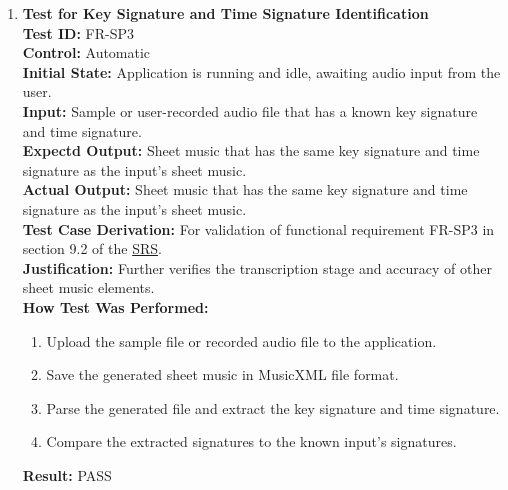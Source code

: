 \documentclass[12pt, titlepage]{article}
\begin{document}
\begin{enumerate}
    \item \textbf{Test for Key Signature and Time Signature Identification} \\
      \newline
      \textbf{Test ID:} FR-SP3 \\
      \textbf{Control:} Automatic \\
      \textbf{Initial State:} Application is running and idle, awaiting audio input from the user. \\
      \textbf{Input:} Sample or user-recorded audio file that has a known key signature and time signature. \\
      \textbf{Expectd Output:} Sheet music that has the same key signature and time signature as the input’s sheet music. \\
      \textbf{Actual Output:} Sheet music that has the same key signature and time signature as the input’s sheet music. \\
      \textbf{Test Case Derivation:} For validation of functional requirement FR-SP3 in section 9.2 of the 
      \href{https://github.com/emilyperica/ScoreGen/blob/main/docs/SRS-Volere/SRS.pdf}{SRS}. \\
      \textbf{Justification:} Further verifies the transcription stage and accuracy of other sheet music elements.\\
      \textbf{How Test Was Performed:}
      \begin{enumerate}
          \item Upload the sample file or recorded audio file to the application.
          \item Save the generated sheet music in MusicXML file format.
          \item Parse the generated file and extract the key signature and time signature.
          \item Compare the extracted signatures to the known input’s signatures.
      \end{enumerate}
      \textbf{Result:} PASS
    \end{enumerate}
\end{document}
